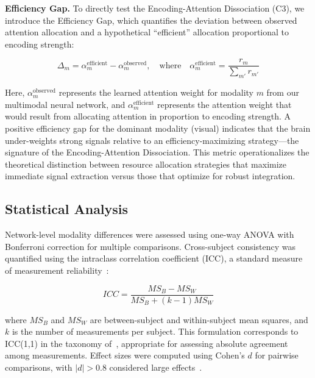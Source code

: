 \documentclass[10pt,letterpaper]{article}
\begin{document}
\textbf{Efficiency Gap.} To directly test the Encoding-Attention Dissociation (C3), we introduce the Efficiency Gap, which quantifies the deviation between observed attention allocation and a hypothetical ``efficient'' allocation proportional to encoding strength:

\begin{equation}\label{eq:delta}
\Delta_m = \alpha_m^{\text{efficient}} - \alpha_m^{\text{observed}}, \quad \text{where} \quad \alpha_m^{\text{efficient}} = \frac{r_m}{\sum_{m'} r_{m'}}
\tag{7}
\end{equation}

Here, $\alpha_m^{\text{observed}}$ represents the learned attention weight for modality $m$ from our multimodal neural network, and $\alpha_m^{\text{efficient}}$ represents the attention weight that would result from allocating attention in proportion to encoding strength. A positive efficiency gap for the dominant modality (visual) indicates that the brain under-weights strong signals relative to an efficiency-maximizing strategy—the signature of the Encoding-Attention Dissociation. This metric operationalizes the theoretical distinction between resource allocation strategies that maximize immediate signal extraction versus those that optimize for robust integration.

\subsection{Statistical Analysis}

Network-level modality differences were assessed using one-way ANOVA with Bonferroni correction for multiple comparisons. Cross-subject consistency was quantified using the intraclass correlation coefficient (ICC), a standard measure of measurement reliability~\citep{shrout1979intraclass}:

\begin{equation}\label{eq:icc}
ICC = \frac{MS_B - MS_W}{MS_B + (k-1)MS_W}
\tag{8}
\end{equation}

where $MS_B$ and $MS_W$ are between-subject and within-subject mean squares, and $k$ is the number of measurements per subject. This formulation corresponds to ICC(1,1) in the taxonomy of~\citet{shrout1979intraclass}, appropriate for assessing absolute agreement among measurements. Effect sizes were computed using Cohen's $d$ for pairwise comparisons, with $|d| > 0.8$ considered large effects~\citep{cohen1988statistical}.
\end{document}
